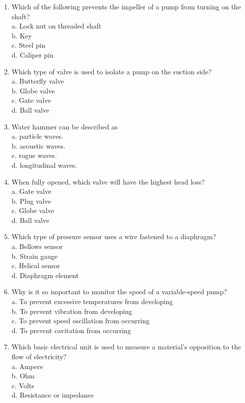 \documentclass[10pt]{article}
\begin{document}
\begin{enumerate}
  \item Which of the following prevents the impeller of a pump from turning on the shaft?\\
a. Lock nut on threaded shaft\\
b. Key\\
c. Steel pin\\
d. Caliper pin

  \item Which type of valve is used to isolate a pump on the suction side?\\
a. Butterfly valve\\
b. Globe valve\\
c. Gate valve\\
d. Ball valve

  \item Water hammer can be described as\\
a. particle waves.\\
b. acoustic waves.\\
c. rogue waves.\\
d. longitudinal waves.

  \item When fully opened, which valve will have the highest head loss?\\
a. Gate valve\\
b. Plug valve\\
c. Globe valve\\
d. Ball valve

  \item Which type of pressure sensor uses a wire fastened to a diaphragm?\\
a. Bellows sensor\\
b. Strain gauge\\
c. Helical sensor\\
d. Diaphragm element

  \item Why is it so important to monitor the speed of a variable-speed pump?\\
a. To prevent excessive temperatures from developing\\
b. To prevent vibration from developing\\
c. To prevent speed oscillation from occurring\\
d. To prevent cavitation from occurring

  \item Which basic electrical unit is used to measure a material's opposition to the flow of electricity?\\
a. Ampere\\
b. Ohm\\
c. Volts\\
d. Resistance or impedance


\end{enumerate}
\end{document}
